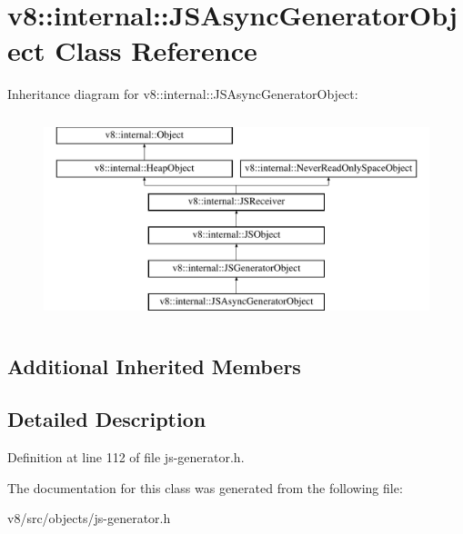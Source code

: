 \hypertarget{classv8_1_1internal_1_1JSAsyncGeneratorObject}{}\section{v8\+:\+:internal\+:\+:J\+S\+Async\+Generator\+Object Class Reference}
\label{classv8_1_1internal_1_1JSAsyncGeneratorObject}
Inheritance diagram for v8\+:\+:internal\+:\+:J\+S\+Async\+Generator\+Object\+:\begin{figure}[H]
\begin{center}
\leavevmode
\includegraphics[height=6.000000cm]{classv8_1_1internal_1_1JSAsyncGeneratorObject}
\end{center}
\end{figure}
\subsection*{Additional Inherited Members}


\subsection{Detailed Description}


Definition at line 112 of file js-\/generator.\+h.



The documentation for this class was generated from the following file\+:\begin{DoxyCompactItemize}
\item 
v8/src/objects/js-\/generator.\+h\end{DoxyCompactItemize}
